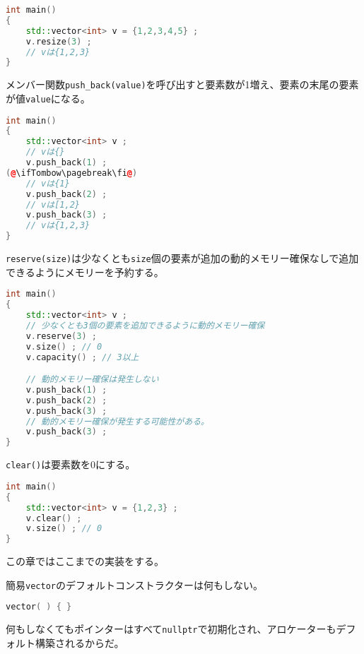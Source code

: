 \begin{lstlisting}[language={C++}]
int main()
{
    std::vector<int> v = {1,2,3,4,5} ;
    v.resize(3) ;
    // vは{1,2,3}
}
\end{lstlisting}

メンバー関数\texttt{push\_back(value)}を呼び出すと要素数が1増え、要素の末尾の要素が値\texttt{value}になる。

\begin{lstlisting}[language={C++}]
int main()
{
    std::vector<int> v ;
    // vは{}
    v.push_back(1) ;
(@\ifTombow\pagebreak\fi@)
    // vは{1}
    v.push_back(2) ;
    // vは[1,2}
    v.push_back(3) ;
    // vは{1,2,3}
}
\end{lstlisting}

\texttt{reserve(size)}は少なくとも\texttt{size}個の要素が追加の動的メモリー確保なしで追加できるようにメモリーを予約する。

\begin{lstlisting}[language={C++}]
int main()
{
    std::vector<int> v ;
    // 少なくとも3個の要素を追加できるように動的メモリー確保
    v.reserve(3) ;
    v.size() ; // 0
    v.capacity() ; // 3以上

    // 動的メモリー確保は発生しない
    v.push_back(1) ;
    v.push_back(2) ;
    v.push_back(3) ;
    // 動的メモリー確保が発生する可能性がある。
    v.push_back(3) ;
}
\end{lstlisting}

\texttt{clear()}は要素数を0にする。

\begin{lstlisting}[language={C++}]
int main()
{
    std::vector<int> v = {1,2,3} ;
    v.clear() ;
    v.size() ; // 0
}
\end{lstlisting}

この章ではここまでの実装をする。

\clearpage
{}

簡易\texttt{vector}のデフォルトコンストラクターは何もしない。

\begin{lstlisting}[language={C++}]
vector( ) { }
\end{lstlisting}

何もしなくてもポインターはすべて\texttt{nullptr}で初期化され、アロケーターもデフォルト構築されるからだ。

